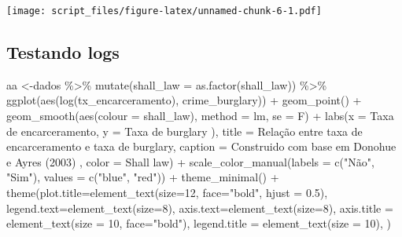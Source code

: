 \documentclass[
]{article}
\newenvironment{Shaded}{\begin{snugshade}}{\end{snugshade}}
\newcommand{\AttributeTok}[1]{\textcolor[rgb]{0.77,0.63,0.00}{#1}}
\newcommand{\DecValTok}[1]{\textcolor[rgb]{0.00,0.00,0.81}{#1}}
\newcommand{\FloatTok}[1]{\textcolor[rgb]{0.00,0.00,0.81}{#1}}
\newcommand{\FunctionTok}[1]{\textcolor[rgb]{0.00,0.00,0.00}{#1}}
\newcommand{\NormalTok}[1]{#1}
\newcommand{\OtherTok}[1]{\textcolor[rgb]{0.56,0.35,0.01}{#1}}
\newcommand{\SpecialCharTok}[1]{\textcolor[rgb]{0.00,0.00,0.00}{#1}}
\newcommand{\StringTok}[1]{\textcolor[rgb]{0.31,0.60,0.02}{#1}}
\begin{document}
\texttt{[image: script\_files/figure-latex/unnamed-chunk-6-1.pdf]}

\hypertarget{testando-logs}{%
\subsection{Testando logs}\label{testando-logs}}

\begin{Shaded}
\begin{Highlighting}[]
\NormalTok{aa }\OtherTok{\textless{}{-}}\NormalTok{dados }\SpecialCharTok{\%\textgreater{}\%} 
  \FunctionTok{mutate}\NormalTok{(}\AttributeTok{shall\_law =} \FunctionTok{as.factor}\NormalTok{(shall\_law)) }\SpecialCharTok{\%\textgreater{}\%} 
  \FunctionTok{ggplot}\NormalTok{(}\FunctionTok{aes}\NormalTok{(}\FunctionTok{log}\NormalTok{(tx\_encarceramento), crime\_burglary)) }\SpecialCharTok{+}
  \FunctionTok{geom\_point}\NormalTok{() }\SpecialCharTok{+} 
  \FunctionTok{geom\_smooth}\NormalTok{(}\FunctionTok{aes}\NormalTok{(}\AttributeTok{colour =}\NormalTok{ shall\_law), }\AttributeTok{method =} \StringTok{\textquotesingle{}lm\textquotesingle{}}\NormalTok{, }\AttributeTok{se =}\NormalTok{ F) }\SpecialCharTok{+}
  \FunctionTok{labs}\NormalTok{(}\AttributeTok{x =} \StringTok{\textquotesingle{}Taxa de encarceramento\textquotesingle{}}\NormalTok{,}
       \AttributeTok{y =} \StringTok{\textquotesingle{}Taxa de burglary )\textquotesingle{}}\NormalTok{,}
       \AttributeTok{title =} \StringTok{\textquotesingle{}Relação entre taxa de encarceramento e taxa de burglary\textquotesingle{}}\NormalTok{,}
       \AttributeTok{caption =} \StringTok{\textquotesingle{}Construido com base em Donohue e Ayres (2003)\textquotesingle{}}\NormalTok{ ,}
       \AttributeTok{color =} \StringTok{\textquotesingle{}Shall law\textquotesingle{}}\NormalTok{) }\SpecialCharTok{+} 
  \FunctionTok{scale\_color\_manual}\NormalTok{(}\AttributeTok{labels =} \FunctionTok{c}\NormalTok{(}\StringTok{"Não"}\NormalTok{, }\StringTok{"Sim"}\NormalTok{), }\AttributeTok{values =} \FunctionTok{c}\NormalTok{(}\StringTok{"blue"}\NormalTok{, }\StringTok{"red"}\NormalTok{)) }\SpecialCharTok{+} 
  \FunctionTok{theme\_minimal}\NormalTok{() }\SpecialCharTok{+}
  \FunctionTok{theme}\NormalTok{(}\AttributeTok{plot.title=}\FunctionTok{element\_text}\NormalTok{(}\AttributeTok{size=}\DecValTok{12}\NormalTok{, }\AttributeTok{face=}\StringTok{"bold"}\NormalTok{, }\AttributeTok{hjust =} \FloatTok{0.5}\NormalTok{),}
        \AttributeTok{legend.text=}\FunctionTok{element\_text}\NormalTok{(}\AttributeTok{size=}\DecValTok{8}\NormalTok{),}
        \AttributeTok{axis.text=}\FunctionTok{element\_text}\NormalTok{(}\AttributeTok{size=}\DecValTok{8}\NormalTok{),}
        \AttributeTok{axis.title =} \FunctionTok{element\_text}\NormalTok{(}\AttributeTok{size =} \DecValTok{10}\NormalTok{, }\AttributeTok{face=}\StringTok{"bold"}\NormalTok{),}
        \AttributeTok{legend.title =} \FunctionTok{element\_text}\NormalTok{(}\AttributeTok{size =} \DecValTok{10}\NormalTok{),}
\NormalTok{  )}



\end{Highlighting}
\end{Shaded}
\end{document}
